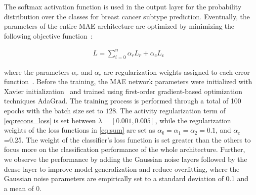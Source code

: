 \hspace*{3.5mm} The softmax activation function is used in the output layer for the probability distribution over the classes for breast cancer subtype prediction. 
Eventually, the parameters of the entire MAE  architecture are optimized by minimizing the following objective function~\cite{mmdcae}:

\vspace{-4mm}
\begin{align}
    {L}=\sum_{i=0}^{n} \alpha_{r} {L}_{r}+\alpha_{c} {L}_{c}
    \label{eq:sum}
\end{align}

\hspace*{3.5mm} where the parameters $\alpha_{r}$ and $\alpha_{c}$ are regularization weights assigned to each error function~\cite{mmdcae}. Before the training, the MAE network parameters were initialized with Xavier initialization~\cite{xavier} and trained using first-order gradient-based optimization techniques AdaGrad. The training process is performed through a total of 100 epochs with the batch size set to $128$. The activity regularization term of \cref{eq:recons_loss} is set between $\lambda=[0.001, 0.005]$, while the regularization weights of the loss functions in \cref{eq:sum} are set as  $\alpha_{0}=\alpha_{1}=\alpha_{2}=0.1$, and $\alpha_{c}$=0.25. The weight of the classifier's loss function is set greater than the others to focus more on the classification performance of the whole architecture. Further, we observe the performance by adding the Gaussian noise layers followed by the dense layer to improve model generalization and reduce overfitting, where the Gaussian noise parameters are empirically set to a standard deviation of 0.1 and a mean of 0. 

